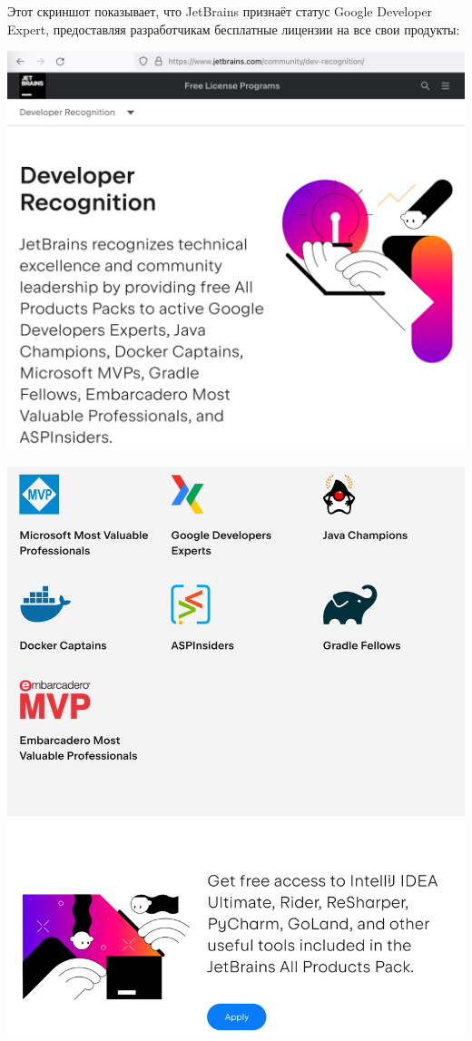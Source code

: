 
Этот скриншот показывает, что JetBrains признаёт
статус Google Developer Expert, предоставляя разработчикам
бесплатные лицензии на все свои продукты:

\includegraphics[width=\textwidth]{jetbrains-recognizes-p1}
\WillContinue

\pagebreak

\Continuing
\includegraphics[width=\textwidth]{jetbrains-recognizes-p2}

